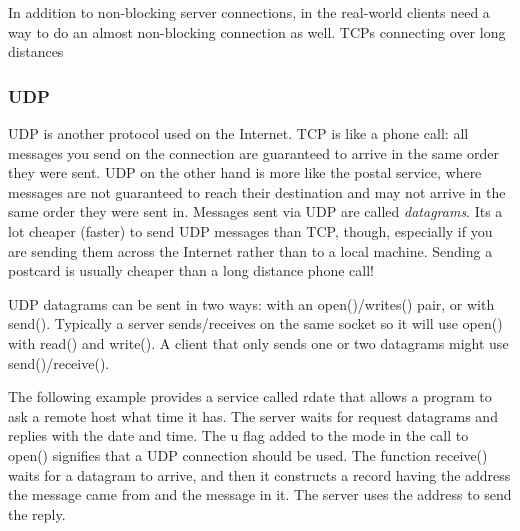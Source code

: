 In addition to non-blocking server connections, in the real-world
clients need a way to do an almost non-blocking connection as well.
TCP{\textquotesingle}s connecting over long distances

\subsubsection{UDP}
UDP is another protocol used on the Internet. TCP is like a
phone call: all messages you send on the connection are guaranteed to
arrive in the same order they were sent. UDP on the other hand is more
like the postal service, where messages are not guaranteed to reach
their destination and may not arrive in the same order they were sent
in. Messages sent via UDP are called \textit{datagrams}.
It{\textquotesingle}s a lot cheaper (faster) to send UDP messages than
TCP, though, especially if you are sending them across the Internet
rather than to a local machine. Sending a postcard is usually cheaper
than a long distance phone call!

UDP datagrams can be sent in two ways: with an \textsf{open()/writes()}
pair, or with \textsf{send()}. Typically a server sends/receives on the
same socket so it will use \textsf{open()} with \textsf{read()} and
\textsf{write()}. A client that only sends one or two datagrams might
use
\textsf{send()}\textsf{/}\textsf{receive()}.

The following example provides a service called
{\textquotedbl}rdate{\textquotedbl} that allows a program to ask a
remote host what time it has. The server waits for request datagrams
and replies with the date and time. The
\textsf{{\textquotedbl}u{\textquotedbl}} flag added to the mode in the
call to \textsf{open()} signifies that a UDP connection should be used.
The function \textsf{receive()} waits for a datagram to arrive, and
then it constructs a record having the address the message came from
and the message in it. The server uses the address to send the reply.


